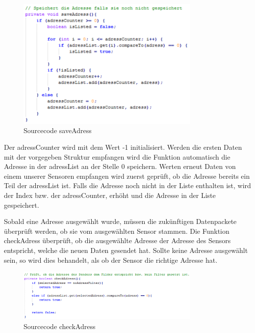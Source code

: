 \begin{figure}[ht]
    \includegraphics[width=0.8\textwidth]{3Vorgehen/imag/app_saveAdress.png}
    \caption{Sourcecode saveAdress}
	\label{app_saveAdress} 
\end{figure}

Der adressCounter wird mit dem Wert -1 initialisiert. Werden die ersten Daten mit der vorgegeben Struktur empfangen wird die Funktion automatisch die Adresse in der adressList an der Stelle 0 speichern. Werten erneut Daten von einem unserer Sensoren empfangen wird zuerst geprüft, ob die Adresse bereits ein Teil der adressList ist. Falls die Adresse noch nicht in der Liste enthalten ist, wird der Index bzw. der adressCounter, erhöht und die Adresse in der Liste gespeichert.

Sobald eine Adresse ausgewählt wurde, müssen die zukünftigen Datenpackete überprüft werden, ob sie vom ausgewählten Sensor stammen. Die Funktion checkAdress überprüft, ob die ausgewählte Adresse der Adresse des Sensors entspricht, welche die neuen Daten gesendet hat. Sollte keine Adresse ausgewählt sein, so wird dies behandelt, als ob der Sensor die richtige Adresse hat.

\begin{figure}[ht]
    \includegraphics[width=0.8\textwidth]{3Vorgehen/imag/app_checkAdress.png}
    \caption{Sourcecode checkAdress}
	\label{app_checkAdress} 
\end{figure}

